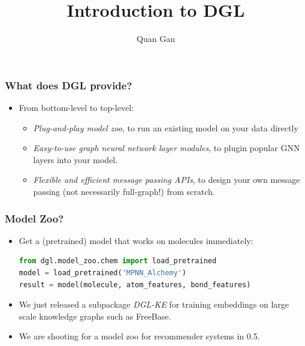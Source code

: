 \documentclass[10pt,aspectratio=169]{beamer}
\begin{document}
	\author{Quan Gan}
	\title{Introduction to DGL}
	\begin{frame}[plain]
		\maketitle
	\end{frame}

	\begin{frame}
		\frametitle{What does DGL provide?}
		\begin{itemize}
			\item From bottom-level to top-level:
			\begin{itemize}
				\item \emph{Plug-and-play model zoo}, to run an existing model on your data directly
				\item \emph{Easy-to-use graph neural network layer modules}, to plugin popular GNN layers into your model.
				\item \emph{Flexible and efficient message passing APIs}, to design your own message passing (not necessarily full-graph!) from scratch.
			\end{itemize}
		\end{itemize}
	\end{frame}
	
	\begin{frame}[fragile]
		\frametitle{Model Zoo?}
		\begin{itemize}
			\item Get a (pretrained) model that works on molecules immediately:
\begin{lstlisting}[language=Python]
from dgl.model_zoo.chem import load_pretrained
model = load_pretrained('MPNN_Alchemy')
result = model(molecule, atom_features, bond_features)
\end{lstlisting}
			\item We just released a subpackage \emph{DGL-KE} for training embeddings on large scale knowledge graphs such as FreeBase.
			\item We are shooting for a model zoo for recommender systems in 0.5.
		\end{itemize}
	\end{frame}
\end{document}
